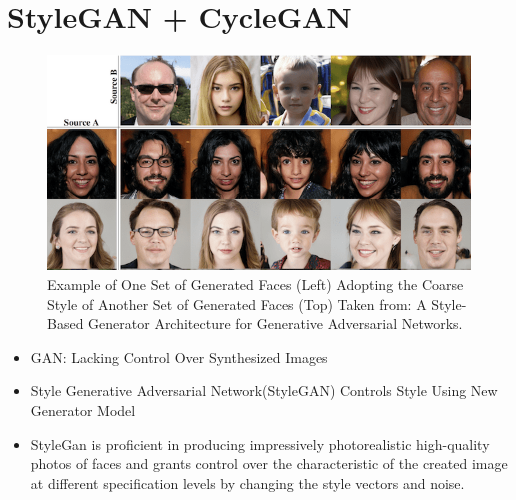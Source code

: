 \section{StyleGAN + CycleGAN}
\begin{frame}

\end{frame}

\begin{frame}
    \begin{figure}[h!]
        {\includegraphics[scale=0.40]{images/stylegan_example1.png}
        \caption{Example of One Set of Generated Faces (Left) Adopting the Coarse Style of Another Set of Generated Faces (Top) Taken from: A Style-Based Generator Architecture for Generative Adversarial Networks.}
        }
	\end{figure}
	\begin{itemize}
		\item<1-> GAN: Lacking Control Over Synthesized Images
		\item<2-> Style Generative Adversarial Network(StyleGAN) Controls Style Using New Generator Model
        \item<3-> StyleGan is proficient in producing impressively photorealistic high-quality photos of faces and grants control over the characteristic of the created image at different specification levels by changing the style vectors and noise.
	\end{itemize}
        
\end{frame}

